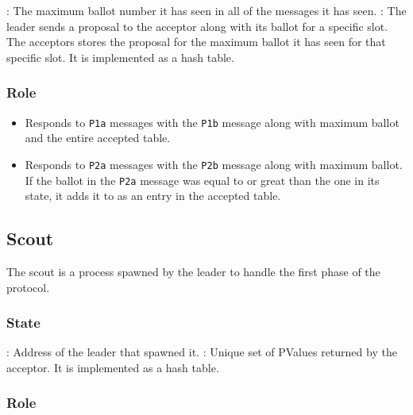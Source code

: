\begin{itemize}
    : The maximum ballot number it has seen in all
    of the messages it has seen.
    : The leader sends a proposal to the acceptor along with
    its ballot for a specific slot. The acceptors stores the proposal for
    the maximum ballot it has seen for that specific slot. It is implemented as
    a hash table.
\end{itemize}

\subsubsection{Role}

\begin{itemize}
  \item Responds to \texttt{P1a} messages with the \texttt{P1b} message
    along with maximum ballot and the entire accepted table.
  \item Responds to \texttt{P2a} messages with the \texttt{P2b} message
    along with maximum ballot. If the ballot in the \texttt{P2a} message
    was equal to or great than the one in its state, it adds it to as
    an entry in the accepted table.
\end{itemize}


\subsection{Scout}

The scout is a process spawned by the leader to handle the first phase of the
protocol.

\subsubsection{State}
\label{section:scout.state}

\begin{itemize}
    : Address of the leader that spawned it.
    :%
    Unique set of PValues returned by the acceptor. It is implemented as a
    hash table.
\end{itemize}

\subsubsection{Role}

